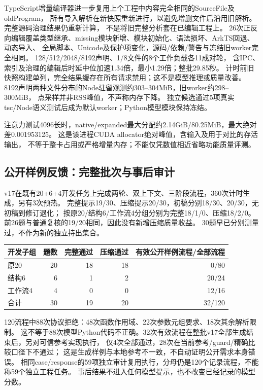 \documentclass[UTF8,a4paper,11pt,fontset=fandol]{ctexart}
\begin{document}
TypeScript增量编译器进一步复用上个工程中内容完全相同的SourceFile及oldProgram，
所有导入解析在新快照重新进行，以避免增删文件后沿用旧解析。完整源码治理结果仍重新计算，
不是将旧完整分析套在已编辑工程上。
26次正反向编辑覆盖类型继承、missing模块新增、模块初始化、语法损坏、ArkTS回退、动态导入、
全局脚本、Unicode及保护项变化，源码/依赖/警告与冻结旧worker完全相同。
128/512/2048/8192声明、1/8文件的8个工作负载各11成对轮，
含IPC、索引及治理的编辑后时延中位加速1.34倍，最小1.29倍；整批29.85秒。
计时前旧快照构建单列，完全结果缓存在所有请求禁用；这不是模型推理或质量改善。
8192声明两种文件分布的Node驻留观测约303--304MiB，旧worker约298--300MiB，
点采样并非RSS峰值，不声称内存下降。
独立候选通过5项真实tsc/Node语义测试后成为默认worker；Python模型模块保持冻结。

注意力测试4096长时，native/expanded最大分配约2.14GiB/80.25MiB，最大绝对差0.001953125。
这是该进程CUDA allocator绝对峰值，含输入及用于对比的存活输出，
不等于整卡占用或严格增量内存；不能仅凭数值相近省略功能质量评测。

\subsection{公开样例反馈：完整批次与事后审计}
v17在既有20+6+4开发任务上完成两轮、双上下文、三阶段流程，360次计时生成，另有3次预热。
完整提示19/30、压缩提示20/30，初稿分别18/30、20/30，无初稿到修订退化；
按原20/结构6/工作流4分组分别为完整18/1/0、压缩18/2/0。
前26题与普通复核的19/20相同，因此没有新增压缩质量收益。
30题早已分别测量过，不作为新的独立持出集合。
\begin{center}
\begin{tabular}{lrrrr}
\toprule
开发子组 & 题数 & 完整通过 & 压缩通过 & 有效公开样例流程/全部流程\\\midrule
原20 & 20 & 18 & 18 & 0/80\\
结构6 & 6 & 1 & 2 & 20/24\\
工作流4 & 4 & 0 & 0 & 12/16\\
合计 & 30 & 19 & 20 & 32/120\\\bottomrule
\end{tabular}
\end{center}
120流程中88次协议拒绝：48次函数作用域、22次参数元组要求、18次其余解析限制。
这不等于88次模型Python代码不正确。32次有效流程在整批v17全部生成结束后，另对可信参考实现执行，
仅4次全部通过，28次在当前参考/guard/精确比较口径下不通过；
这是生成样例与本地参考不一致，不自动证明公开需求本身错误。
相同case/response的59项独立审计复用执行，分母仍是120个记录流程，不能称59个独立工程任务。
事后结果不进入任何模型提示，也不改变已经记录的模型分数。
\end{document}
